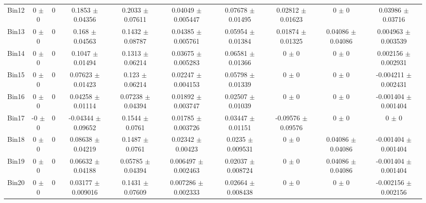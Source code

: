 \begin{tabular}{@{\extracolsep{4pt}}lccccccccc@{}}
     Bin12 & 0 $\pm$ 0 & 0 & 0.1853 $\pm$ 0.04356 & 0.2033 $\pm$ 0.07611 & 0.04049 $\pm$ 0.005447 & 0.07678 $\pm$ 0.01495 & 0.02812 $\pm$ 0.01623 & 0 $\pm$ 0 & 0.03986 $\pm$ 0.03716 \\ 
     Bin13 & 0 $\pm$ 0 & 0 & 0.168 $\pm$ 0.04563 & 0.1432 $\pm$ 0.08787 & 0.04385 $\pm$ 0.005761 & 0.05954 $\pm$ 0.01384 & 0.01874 $\pm$ 0.01325 & 0.04086 $\pm$ 0.04086 & 0.004963 $\pm$ 0.003539 \\ 
     Bin14 & 0 $\pm$ 0 & 0 & 0.1047 $\pm$ 0.01494 & 0.1313 $\pm$ 0.06214 & 0.03675 $\pm$ 0.005283 & 0.06581 $\pm$ 0.01366 & 0 $\pm$ 0 & 0 $\pm$ 0 & 0.002156 $\pm$ 0.002931 \\ 
     Bin15 & 0 $\pm$ 0 & 0 & 0.07623 $\pm$ 0.01423 & 0.123 $\pm$ 0.06214 & 0.02247 $\pm$ 0.004153 & 0.05798 $\pm$ 0.01339 & 0 $\pm$ 0 & 0 $\pm$ 0 & -0.004211 $\pm$ 0.002431 \\ 
     Bin16 & 0 $\pm$ 0 & 0 & 0.04258 $\pm$ 0.01114 & 0.07238 $\pm$ 0.04394 & 0.01892 $\pm$ 0.003747 & 0.02507 $\pm$ 0.01039 & 0 $\pm$ 0 & 0 $\pm$ 0 & -0.001404 $\pm$ 0.001404 \\ 
     Bin17 & -0 $\pm$ 0 & 0 & -0.04344 $\pm$ 0.09652 & 0.1544 $\pm$ 0.0761 & 0.01785 $\pm$ 0.003726 & 0.03447 $\pm$ 0.01151 & -0.09576 $\pm$ 0.09576 & 0 $\pm$ 0 & 0 $\pm$ 0 \\ 
     Bin18 & 0 $\pm$ 0 & 0 & 0.08638 $\pm$ 0.04219 & 0.1487 $\pm$ 0.0761 & 0.02342 $\pm$ 0.00423 & 0.0235 $\pm$ 0.009531 & 0 $\pm$ 0 & 0.04086 $\pm$ 0.04086 & -0.001404 $\pm$ 0.001404 \\ 
     Bin19 & 0 $\pm$ 0 & 0 & 0.06632 $\pm$ 0.04188 & 0.05785 $\pm$ 0.04394 & 0.006497 $\pm$ 0.002463 & 0.02037 $\pm$ 0.008724 & 0 $\pm$ 0 & 0.04086 $\pm$ 0.04086 & -0.001404 $\pm$ 0.001404 \\ 
     Bin20 & 0 $\pm$ 0 & 0 & 0.03177 $\pm$ 0.009016 & 0.1431 $\pm$ 0.07609 & 0.007286 $\pm$ 0.002333 & 0.02664 $\pm$ 0.008438 & 0 $\pm$ 0 & 0 $\pm$ 0 & -0.002156 $\pm$ 0.002156 \\ 
\hline\hline
  \end{tabular}
